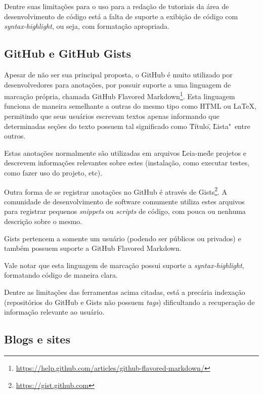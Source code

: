 Dentre suas limitações para o uso para a redação de tutoriais da área de desenvolvimento de código está a falta de suporte a exibição de código com \textit{syntax-highlight}, ou seja, com formatação apropriada.


\subsection{GitHub e GitHub Gists}

Apesar de não ser sua principal proposta, o GitHub é muito utilizado por desenvolvedores para anotações, por possuir suporte a uma linguagem de marcação própria, chamada GitHub Flavored Markdown\footnote{\url{https://help.github.com/articles/github-flavored-markdown/}}. Esta linguagem funciona de maneira semelhante a outras do mesmo tipo como HTML ou LaTeX, permitindo que seus usuários escrevam textos apenas informando que determinadas seções do texto possuem tal significado como \"Título\", \"Lista"\, entre outros.

Estas anotações normalmente são utilizadas em arquivos \"Leia-me\" de projetos e descrevem informações relevantes sobre estes (instalação, como executar testes, como fazer uso do projeto, etc).


Outra forma de se registrar anotações no GitHub é através de Gists\footnote{\url{https://gist.github.com}}. A comunidade de desenvolvimento de software comumente utiliza estes arquivos para registrar pequenos \textit{snippets} ou \textit{scripts} de código, com pouca ou nenhuma descrição sobre o mesmo.

Gists pertencem a somente um usuário (podendo ser públicos ou privados) e também possuem suporte a GitHub Flavored Markdown.

Vale notar que esta linguagem de marcação possui suporte a \textit{syntax-highlight}, formatando código de maneira clara.


Dentre as limitações das ferramentas acima citadas, está a precária indexação (repositórios do GitHub e Gists não possuem \textit{tags}) dificultando a recuperação de informação relevante ao usuário.


\subsection{Blogs e sites}

